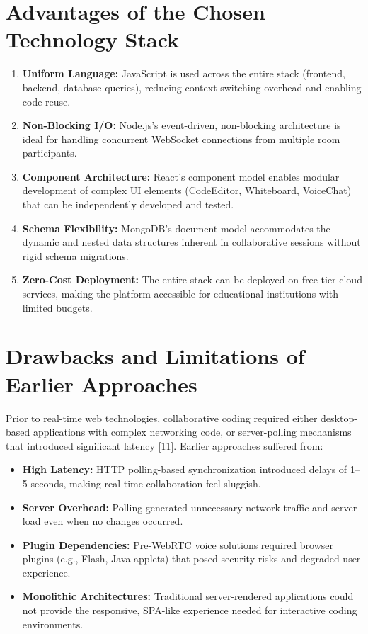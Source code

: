 \documentclass[12pt,a4paper,oneside]{report}
\begin{document}
\section{Advantages of the Chosen Technology Stack}

\begin{enumerate}[label=\arabic*.]
    \item \textbf{Uniform Language:} JavaScript is used across the entire stack (frontend, backend, database queries), reducing context-switching overhead and enabling code reuse.
    \item \textbf{Non-Blocking I/O:} Node.js's event-driven, non-blocking architecture is ideal for handling concurrent WebSocket connections from multiple room participants.
    \item \textbf{Component Architecture:} React's component model enables modular development of complex UI elements (CodeEditor, Whiteboard, VoiceChat) that can be independently developed and tested.
    \item \textbf{Schema Flexibility:} MongoDB's document model accommodates the dynamic and nested data structures inherent in collaborative sessions without rigid schema migrations.
    \item \textbf{Zero-Cost Deployment:} The entire stack can be deployed on free-tier cloud services, making the platform accessible for educational institutions with limited budgets.
\end{enumerate}

\section{Drawbacks and Limitations of Earlier Approaches}

Prior to real-time web technologies, collaborative coding required either desktop-based applications with complex networking code, or server-polling mechanisms that introduced significant latency [11]. Earlier approaches suffered from:

\begin{itemize}
    \item \textbf{High Latency:} HTTP polling-based synchronization introduced delays of 1--5 seconds, making real-time collaboration feel sluggish.
    \item \textbf{Server Overhead:} Polling generated unnecessary network traffic and server load even when no changes occurred.
    \item \textbf{Plugin Dependencies:} Pre-WebRTC voice solutions required browser plugins (e.g., Flash, Java applets) that posed security risks and degraded user experience.
    \item \textbf{Monolithic Architectures:} Traditional server-rendered applications could not provide the responsive, SPA-like experience needed for interactive coding environments.
\end{itemize}
\end{document}
